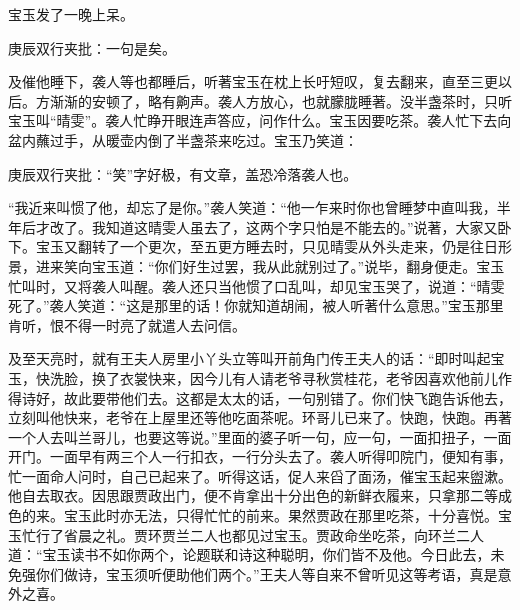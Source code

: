 \begin{parag}


    宝玉发了一晚上呆。\begin{note}庚辰双行夹批：一句是矣。\end{note}及催他睡下，袭人等也都睡后，听著宝玉在枕上长吁短叹，复去翻来，直至三更以后。方渐渐的安顿了，略有齁声。袭人方放心，也就朦胧睡著。没半盏茶时，只听宝玉叫“晴雯”。袭人忙睁开眼连声答应，问作什么。宝玉因要吃茶。袭人忙下去向盆内蘸过手，从暖壶内倒了半盏茶来吃过。宝玉乃笑道：\begin{note}庚辰双行夹批：“笑”字好极，有文章，盖恐冷落袭人也。\end{note}“我近来叫惯了他，却忘了是你。”袭人笑道：“他一乍来时你也曾睡梦中直叫我，半年后才改了。我知道这晴雯人虽去了，这两个字只怕是不能去的。”说著，大家又卧下。宝玉又翻转了一个更次，至五更方睡去时，只见晴雯从外头走来，仍是往日形景，进来笑向宝玉道：“你们好生过罢，我从此就别过了。”说毕，翻身便走。宝玉忙叫时，又将袭人叫醒。袭人还只当他惯了口乱叫，却见宝玉哭了，说道：“晴雯死了。”袭人笑道：“这是那里的话！你就知道胡闹，被人听著什么意思。”宝玉那里肯听，恨不得一时亮了就遣人去问信。
\end{parag}


\begin{parag}


    及至天亮时，就有王夫人房里小丫头立等叫开前角门传王夫人的话：“即时叫起宝玉，快洗脸，换了衣裳快来，因今儿有人请老爷寻秋赏桂花，老爷因喜欢他前儿作得诗好，故此要带他们去。这都是太太的话，一句别错了。你们快飞跑告诉他去，立刻叫他快来，老爷在上屋里还等他吃面茶呢。环哥儿已来了。快跑，快跑。再著一个人去叫兰哥儿，也要这等说。”里面的婆子听一句，应一句，一面扣扭子，一面开门。一面早有两三个人一行扣衣，一行分头去了。袭人听得叩院门，便知有事，忙一面命人问时，自己已起来了。听得这话，促人来舀了面汤，催宝玉起来盥漱。他自去取衣。因思跟贾政出门，便不肯拿出十分出色的新鲜衣履来，只拿那二等成色的来。宝玉此时亦无法，只得忙忙的前来。果然贾政在那里吃茶，十分喜悦。宝玉忙行了省晨之礼。贾环贾兰二人也都见过宝玉。贾政命坐吃茶，向环兰二人道：“宝玉读书不如你两个，论题联和诗这种聪明，你们皆不及他。今日此去，未免强你们做诗，宝玉须听便助他们两个。”王夫人等自来不曾听见这等考语，真是意外之喜。
\end{parag}


